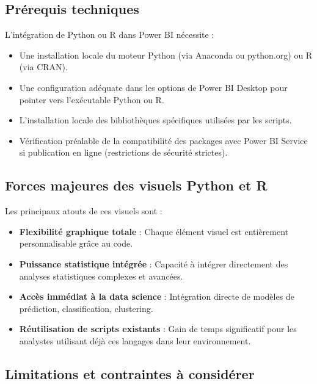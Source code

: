 \subsection{Prérequis techniques}

L’intégration de Python ou R dans Power BI nécessite :
\begin{itemize}
\item Une installation locale du moteur Python (via Anaconda ou python.org) ou R (via CRAN).
\item Une configuration adéquate dans les options de Power BI Desktop pour pointer vers l’exécutable Python ou R.
\item L’installation locale des bibliothèques spécifiques utilisées par les scripts.
\item Vérification préalable de la compatibilité des packages avec Power BI Service si publication en ligne (restrictions de sécurité strictes).
\end{itemize}

\subsection{Forces majeures des visuels Python et R}

Les principaux atouts de ces visuels sont :
\begin{itemize}
\item \textbf{Flexibilité graphique totale} : Chaque élément visuel est entièrement personnalisable grâce au code.
\item \textbf{Puissance statistique intégrée} : Capacité à intégrer directement des analyses statistiques complexes et avancées.
\item \textbf{Accès immédiat à la data science} : Intégration directe de modèles de prédiction, classification, clustering.
\item \textbf{Réutilisation de scripts existants} : Gain de temps significatif pour les analystes utilisant déjà ces langages dans leur environnement.
\end{itemize}

\subsection{Limitations et contraintes à considérer}

